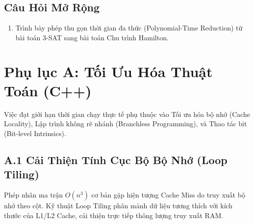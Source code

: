 \documentclass[11pt, letterpaper]{report}
\begin{document}
\section{Câu Hỏi Mở Rộng}
\begin{enumerate}
 \item Trình bày phép thu gọn thời gian đa thức (Polynomial-Time Reduction) từ bài toán 3-SAT sang bài toán Chu trình Hamilton.
\end{enumerate}





\newpage
\chapter*{Phụ lục A: Tối Ưu Hóa Thuật Toán (C++)}
\label{chap:appendix}

Việc đạt giới hạn thời gian chạy thực tế phụ thuộc vào Tối ưu hóa bộ nhớ (Cache Locality), Lập trình không rẽ nhánh (Branchless Programming), và Thao tác bit (Bit-level Intrinsics).

\section*{A.1 Cải Thiện Tính Cục Bộ Bộ Nhớ (Loop Tiling)}
Phép nhân ma trận $O(n^3)$ cơ bản gặp hiện tượng Cache Miss do truy xuất bộ nhớ theo cột. Kỹ thuật Loop Tiling phân mảnh dữ liệu tương thích với kích thước của L1/L2 Cache, cải thiện trực tiếp thông lượng truy xuất RAM.
\end{document}
